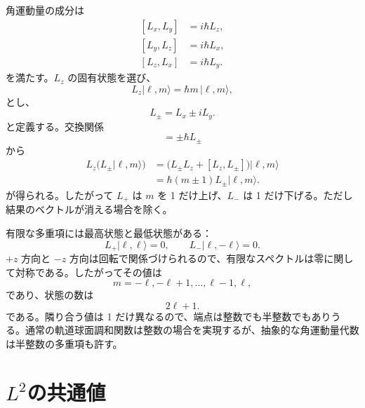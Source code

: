 角運動量の成分は
\begin{equation}
\begin{aligned}
[L_x,L_y]&=i\hbar L_z,\\
[L_y,L_z]&=i\hbar L_x,\\
[L_z,L_x]&=i\hbar L_y.
\end{aligned}
\end{equation}
を満たす。\(L_z\) の固有状態を選び、
\begin{equation}
L_z|\ell,m\rangle=\hbar m\,|\ell,m\rangle,
\end{equation}
とし、
\begin{equation}
L_\pm=L_x\pm iL_y.
\end{equation}
と定義する。交換関係
\begin{equation}
[L_z,L_\pm]=\pm\hbar L_\pm
\end{equation}
から
\begin{align}
L_z\bigl(L_\pm|\ell,m\rangle\bigr)
&=\bigl(L_\pm L_z+[L_z,L_\pm]\bigr)|\ell,m\rangle \\
&=\hbar(m\pm1)L_\pm|\ell,m\rangle.
\end{align}
が得られる。したがって \(L_+\) は \(m\) を 1 だけ上げ、\(L_-\) は 1 だけ下げる。ただし結果のベクトルが消える場合を除く。

有限な多重項には最高状態と最低状態がある：
\begin{equation}
L_+|\ell,\ell\rangle=0,
\qquad
L_-|\ell,-\ell\rangle=0.
\end{equation}
\(+z\) 方向と \(-z\) 方向は回転で関係づけられるので、有限なスペクトルは零に関して対称である。したがってその値は
\begin{equation}
m=-\ell,-\ell+1,\ldots,\ell-1,\ell,
\end{equation}
であり、状態の数は
\begin{equation}
2\ell+1.
\end{equation}
である。隣り合う値は 1 だけ異なるので、端点は整数でも半整数でもありうる。通常の軌道球面調和関数は整数の場合を実現するが、抽象的な角運動量代数は半整数の多重項も許す。

\begin{classroomqa}
\end{classroomqa}

\section{\texorpdfstring{\(L^2\)}{Lの二乗}の共通値}

